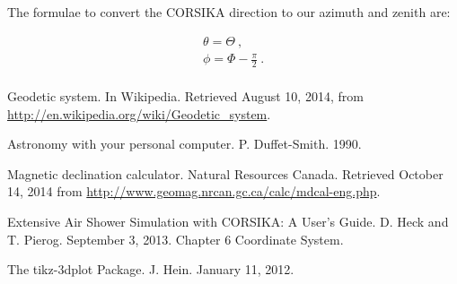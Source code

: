 The formulae to convert the CORSIKA direction to our azimuth and zenith are:

\begin{equation}
    \begin{array}{l}
        \theta = \Theta \ , \\
        \phi = \Phi - \frac{\pi}{2} \ . \\
    \end{array}
\end{equation}




\begin{thebibliography}{9}

Geodetic system. In Wikipedia. Retrieved August 10, 2014,
from \url{http://en.wikipedia.org/wiki/Geodetic_system}.

Astronomy with your personal computer. P. Duffet-Smith.
1990.

Magnetic declination calculator. Natural Resources Canada.
Retrieved October 14, 2014 from
\url{http://www.geomag.nrcan.gc.ca/calc/mdcal-eng.php}.

Extensive Air Shower Simulation with CORSIKA: A User’s Guide. D. Heck
and T. Pierog. September 3, 2013. Chapter 6 Coordinate System.

The tikz-3dplot Package. J. Hein. January 11, 2012.

\end{thebibliography}
